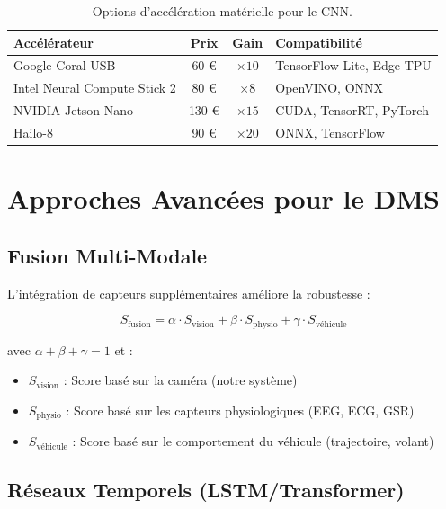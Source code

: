 \documentclass[12pt,a4paper,twoside]{report}
\begin{document}
\begin{table}[H]
\centering
\caption{Options d'accélération matérielle pour le CNN.}
\label{tab:hw_acceleration}
\renewcommand{\arraystretch}{1.3}
\begin{tabularx}{\textwidth}{|l|c|c|X|}
\hline
\rowcolor{stellantisblue!15}
\textbf{Accélérateur} & \textbf{Prix} & \textbf{Gain} & \textbf{Compatibilité} \\
\hline
Google Coral USB & 60 € & $\times 10$ & TensorFlow Lite, Edge TPU \\
\hline
Intel Neural Compute Stick 2 & 80 € & $\times 8$ & OpenVINO, ONNX \\
\hline
NVIDIA Jetson Nano & 130 € & $\times 15$ & CUDA, TensorRT, PyTorch \\
\hline
Hailo-8 & 90 € & $\times 20$ & ONNX, TensorFlow \\
\hline
\end{tabularx}
\end{table}

\section{Approches Avancées pour le DMS}

\subsection{Fusion Multi-Modale}

L'intégration de capteurs supplémentaires améliore la robustesse :

\begin{equation}
S_{\text{fusion}} = \alpha \cdot S_{\text{vision}} + \beta \cdot S_{\text{physio}} + \gamma \cdot S_{\text{véhicule}}
\label{eq:multimodal_fusion}
\end{equation}

avec $\alpha + \beta + \gamma = 1$ et :
\begin{itemize}
    \item $S_{\text{vision}}$ : Score basé sur la caméra (notre système)
    \item $S_{\text{physio}}$ : Score basé sur les capteurs physiologiques (EEG, ECG, GSR)
    \item $S_{\text{véhicule}}$ : Score basé sur le comportement du véhicule (trajectoire, volant)
\end{itemize}

\subsection{Réseaux Temporels (LSTM/Transformer)}
\end{document}
